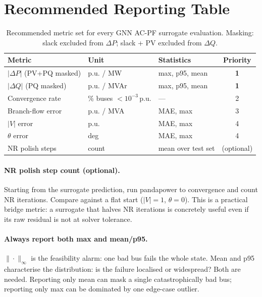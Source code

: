 \documentclass{article}
\begin{document}
\section{Recommended Reporting Table}

\begin{table}[h]
\centering
\caption{Recommended metric set for every GNN AC-PF surrogate evaluation.
  Masking: slack excluded from $\Delta P$; slack + PV excluded from
  $\Delta Q$.}
\label{tab:reporting}
\begin{tabular}{lllc}
\toprule
Metric & Unit & Statistics & Priority \\
\midrule
$|\Delta P|$ (PV+PQ masked) & p.u. / MW   & max, p95, mean & \textbf{1} \\
$|\Delta Q|$ (PQ masked)    & p.u. / MVAr & max, p95, mean & \textbf{1} \\
Convergence rate
  & \% buses $< 10^{-3}$\,p.u. & --- & 2 \\
Branch-flow error
  & p.u. / MVA & MAE, max & 3 \\
$|V|$ error & p.u. & MAE, max & 4 \\
$\theta$ error & deg & MAE, max & 4 \\
NR polish steps & count & mean over test set & (optional) \\
\bottomrule
\end{tabular}
\end{table}

\paragraph{NR polish step count (optional).}
Starting from the surrogate prediction, run pandapower to convergence and
count NR iterations.  Compare against a flat start ($|V|=1$, $\theta=0$).
This is a practical bridge metric: a surrogate that halves NR iterations is
concretely useful even if its raw residual is not at solver tolerance.

\paragraph{Always report both max and mean/p95.}
$\|\cdot\|_\infty$ is the feasibility alarm: one bad bus fails the whole
state.  Mean and p95 characterise the distribution: is the failure
localised or widespread?  Both are needed.  Reporting only mean can mask
a single catastrophically bad bus; reporting only max can be dominated by
one edge-case outlier.
\end{document}

